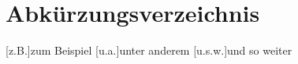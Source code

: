 \section*{\fontsize{20}{0} \selectfont Abkürzungsverzeichnis}
\begin{acronym}[]\itemsep0pt %
	
	[z.B.]{zum Beispiel}
	[u.a.]{unter anderem}
	[u.s.w.]{und so weiter}
\end{acronym}
